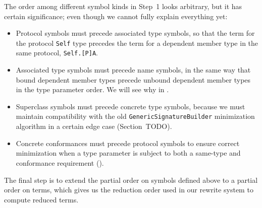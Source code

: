 \documentclass[../generics]{subfiles}
\begin{document}
The order among different symbol kinds in Step~1 looks arbitrary, but it has certain significance; even though we cannot fully explain everything yet:
\begin{itemize}
\item Protocol symbols must precede associated type symbols, so that the term for the protocol \verb|Self| type precedes the term for a dependent member type in the same protocol, \verb|Self.[P]A|.
\item Associated type symbols must precede name symbols, in the same way that bound dependent member types precede unbound dependent member types in the type parameter order. We will see why in .
\item Superclass symbols must precede concrete type symbols, because we must maintain compatibility with the old \texttt{GenericSignatureBuilder} minimization algorithm in a certain edge case (Section~TODO).
\item Concrete conformances must precede protocol symbols to ensure correct minimization when a type parameter is subject to both a same-type and conformance requirement ().
\end{itemize}

%
%
%
%
The final step is to extend the partial order on symbols defined above to a partial order on terms, which gives us the reduction order used in our rewrite system to compute reduced terms.
\end{document}
